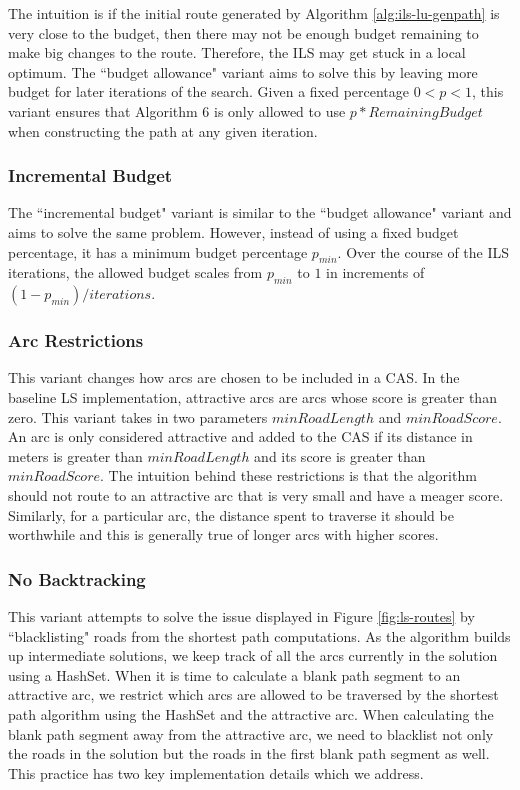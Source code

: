 \documentclass[honors]{union-cs-thesis}
\begin{document}
The intuition is if the initial route generated by Algorithm \ref{alg:ils-lu-genpath} is very close to the budget, then there may not be enough budget remaining to make big changes to the route. Therefore, the ILS may get stuck in a local optimum. The ``budget allowance" variant aims to solve this by leaving more budget for later iterations of the search. Given a fixed percentage $0 < p < 1$, this variant ensures that Algorithm 6 is only allowed to use $p * RemainingBudget$ when constructing the path at any given iteration. 

\subsubsection{Incremental Budget}
The ``incremental budget" variant is similar to the ``budget allowance" variant and aims to solve the same problem. However, instead of using a fixed budget percentage, it has a minimum budget percentage $p_{min}$. Over the course of the ILS iterations, the allowed budget scales from $p_{min}$ to $1$ in increments of $(1 - p_{min}) / iterations$. 

\subsubsection{Arc Restrictions}
This variant changes how arcs are chosen to be included in a CAS. In the baseline LS implementation, attractive arcs are arcs whose score is greater than zero. This variant takes in two parameters $minRoadLength$ and $minRoadScore$. An arc is only considered attractive and added to the CAS if its distance in meters is greater than $minRoadLength$ and its score is greater than $minRoadScore$. The intuition behind these restrictions is that the algorithm should not route to an attractive arc that is very small and have a meager score. Similarly, for a particular arc, the distance spent to traverse it should be worthwhile and this is generally true of longer arcs with higher scores. 

\subsubsection{No Backtracking}
This variant attempts to solve the issue displayed in Figure \ref{fig:ls-routes} by ``blacklisting" roads from the shortest path computations. As the algorithm builds up intermediate solutions, we keep track of all the arcs currently in the solution using a HashSet. When it is time to calculate a blank path segment to an attractive arc, we restrict which arcs are allowed to be traversed by the shortest path algorithm using the HashSet and the attractive arc. When calculating the blank path segment away from the attractive arc, we need to blacklist not only the roads in the solution but the roads in the first blank path segment as well. This practice has two key implementation details which we address.
\end{document}
